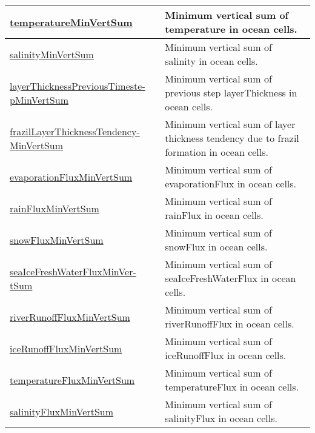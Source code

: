 {\begin{center}
\begin{longtable}{| p{2.0in} | p{4.0in} |}
    \hline
    \hyperref[subsec:var_sec_globalStatsAM_temperatureMinVertSum]{temperatureMinVertSum} & Minimum vertical sum of temperature in ocean cells. \\
    \hline
    \hyperref[subsec:var_sec_globalStatsAM_salinityMinVertSum]{salinityMinVertSum} & Minimum vertical sum of salinity in ocean cells. \\
    \hline
    \hyperref[subsec:var_sec_globalStatsAM_layerThicknessPreviousTimestepMinVertSum]{layerThicknessPreviousTimeste-}\hyperref[subsec:var_sec_globalStatsAM_layerThicknessPreviousTimestepMinVertSum]{pMinVertSum}  & Minimum vertical sum of previous step layerThickness in ocean cells. \\
    \hline
    \hyperref[subsec:var_sec_globalStatsAM_frazilLayerThicknessTendencyMinVertSum]{frazilLayerThicknessTendency-}\hyperref[subsec:var_sec_globalStatsAM_frazilLayerThicknessTendencyMinVertSum]{MinVertSum}  & Minimum vertical sum of layer thickness tendency due to frazil formation in ocean cells. \\
    \hline
    \hyperref[subsec:var_sec_globalStatsAM_evaporationFluxMinVertSum]{evaporationFluxMinVertSum} & Minimum vertical sum of evaporationFlux in ocean cells. \\
    \hline
    \hyperref[subsec:var_sec_globalStatsAM_rainFluxMinVertSum]{rainFluxMinVertSum} & Minimum vertical sum of rainFlux in ocean cells. \\
    \hline
    \hyperref[subsec:var_sec_globalStatsAM_snowFluxMinVertSum]{snowFluxMinVertSum} & Minimum vertical sum of snowFlux in ocean cells. \\
    \hline
    \hyperref[subsec:var_sec_globalStatsAM_seaIceFreshWaterFluxMinVertSum]{seaIceFreshWaterFluxMinVer-}\hyperref[subsec:var_sec_globalStatsAM_seaIceFreshWaterFluxMinVertSum]{tSum}  & Minimum vertical sum of seaIceFreshWaterFlux in ocean cells. \\
    \hline
    \hyperref[subsec:var_sec_globalStatsAM_riverRunoffFluxMinVertSum]{riverRunoffFluxMinVertSum} & Minimum vertical sum of riverRunoffFlux in ocean cells. \\
    \hline
    \hyperref[subsec:var_sec_globalStatsAM_iceRunoffFluxMinVertSum]{iceRunoffFluxMinVertSum} & Minimum vertical sum of iceRunoffFlux in ocean cells. \\
    \hline
    \hyperref[subsec:var_sec_globalStatsAM_temperatureFluxMinVertSum]{temperatureFluxMinVertSum} & Minimum vertical sum of temperatureFlux in ocean cells. \\
    \hline
    \hyperref[subsec:var_sec_globalStatsAM_salinityFluxMinVertSum]{salinityFluxMinVertSum} & Minimum vertical sum of salinityFlux in ocean cells. \\

\end{longtable}
\end{center}}
